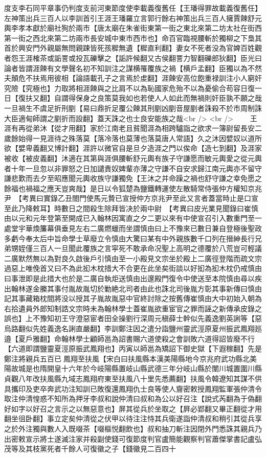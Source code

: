 度支李石同平章事仍判度支前河東節度使李載義復舊任【王璠得罪故載義復舊任】左神策出兵三百人以李訓首引王涯王璠羅立言郭行餘右神策出兵三百人擁賈餗舒元輿李孝本獻於廟社狥於兩市【唐太廟在朱雀街東第一街之東北來第二坊太社在街西第一街之西北來第二坊兩市長安城中東市西市也】命百官臨視腰斬於獨柳之下梟其首於興安門外親屬無問親踈皆死孩穉無遺【穉直利翻】妻女不死者没為官婢百姓觀者怨王涯榷茶或詬詈或投瓦礫擊之【詬許候翻又古侯翻詈力智翻礫郎狄翻】臣光曰論者皆謂涯餗有文學聲名初不知訓注之謀横罹覆族之禍【横戶孟翻】臣獨以為不然夫顛危不扶焉用彼相【論語載孔子之言焉於䖍翻】涯餗安高位飽重禄訓注小人窮奸究險【究極也】力取將相涯餗與之比肩不以為恥國家危殆不以為憂偷合苟容日復一日【復扶又翻】自謂得保身之良策莫我如也若使人人如此而無禍則奸臣孰不願之哉一旦禍生不虞足折刑剭【易曰鼎折足覆公餗其刑剭凶剭音屋剭者誅殺不於市周制誅大臣適甸師謂之剭折而設翻】蓋天誅之也士良安能族之哉<br />
<br />
　　王涯有再從弟沐【從才用翻】家於江南老且貧聞涯為相跨驢詣之欲求一簿尉留長安二歲餘始得一見涯待之殊落莫【落冷落也莫薄也落莫唐人常語】久之沐因嬖奴以道所欲【嬖卑義翻又博計翻】涯許以微官自是旦夕造涯之門以俟命【造七到翻】及涯家被收【被皮義翻】沐適在其第與涯俱腰斬舒元輿有族子守謙愿而敏元輿愛之從元輿者十年一旦忽以非罪怒之日加譴責奴婢輩亦薄之守謙不自安求歸江南元輿亦不留守謙悲歎而去夕至昭應聞元輿收族守謙獨免【王沐之并命躁之禍也舒守謙之幸免愿之餘福也禍福之應天豈爽哉】是日以令狐楚為鹽鐵轉運使左散騎常侍張仲方權知京兆尹　【考異曰實錄乙丑閤門使馬元贄已宣授仲方京兆尹至此又言者蓋當時止是口宣至此乃降敕耳】時數日之間殺生除拜皆决於兩中尉　【考異曰皮光業見聞錄曰崔慎由以元和元年登第至開成已入翰林因寓直之夕二更以來有中使宣召引入數重門至一處堂宇華煥簾幕俱垂見左右二廣燃蠟而坐謂慎由曰上不豫來已數日兼自登極後聖政多虧今奉太后中旨命學士草廢立令慎由大驚曰某有中外親族數千口列在搢紳長行兄弟甥姪僅三百人一旦聞此覆族之言寜死不敢承命况聖上高明之德覆於八荒豈可輕議二廣默然無以為對良久啟後戶引慎由至一小殿見文宗坐於殿上二廣徑登階而疏文宗過惡上唯俛首又曰不為此抝木枕措大不合更在此坐矣街談以好抝為抝木枕仍戒慎由曰事泄即是此措大也於是二廣自執炬送慎由出邃殿門復令中使送至本院慎由尋以疾出翰林遂金縢其事付胤故胤切於勦絶北司者由此也誅北司後胤方彰其事新傳曰慎由記其事藏箱枕間將没以授其子胤故胤惡中官終討除之按舊傳崔慎由大中初始入朝為右拾遺員外郎知制誥文宗時未為翰林學士蓋崔胤欲重宦官之罪而誣之新傳承皮錄之誤也】上不豫知初王守澄惡宦者田全操劉行深周元稹薛士幹似先義逸劉英誗等【惡烏路翻似先姓義逸名誗直嚴翻】李訓鄭注因之遣分詣鹽州靈武涇原夏州振武鳳翔廵邉【夏戶雅翻】命翰林學士顧師邕為詔書賜六道使殺之會訓敗六道得詔皆廢不行【六道即謂鹽靈夏涇原振武鳳翔也】丙寅以師邕為矯詔下御史獄【下遐稼翻】先是鄭注將親兵五百已鳳翔至扶風【宋白曰扶風縣本漢美陽縣地今京兆府武功縣北美陽故城是也隋開皇十六年於今岐陽縣置岐山縣武德三年分岐山縣於闈川城置圍川縣貞觀八年改扶風縣九域志鳳翔府東至扶風八十里先悉薦翻】扶風令韓遼知其謀不供具攜印及吏卒奔武功注知訓已敗復還鳳翔仇士良等使人齎密敕授鳳翔監軍張仲清令取注仲清惶惑不知所為押牙李叔和說仲清曰叔和為公以好召注【說式芮翻為于偽翻好如字以好召之言示之以無惡意也】屏其從兵於坐取之【屛必郢翻又畢正翻從才用翻坐徂卧翻】事立定矣仲清從之伏甲以待注注恃其兵衛遂詣仲清叔和稍引其從兵享之於外注獨與數人入既啜茶【啜樞悦翻飲也】叔和抽刀斬注因閉外門悉誅其親兵乃出密敕宣示將士遂滅注家并殺副使錢可復節度判官盧簡能觀察判官蕭傑掌書記盧弘茂等及其枝黨死者千餘人可復徽之子【錢徽見二百四十